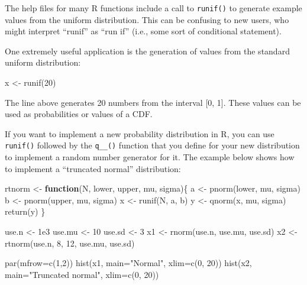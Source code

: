 \documentclass[
  13,
  letterpaper,
]{report}
\newenvironment{Shaded}{\begin{snugshade}}{\end{snugshade}}
\newcommand{\AttributeTok}[1]{\textcolor[rgb]{0.40,0.45,0.13}{#1}}
\newcommand{\ControlFlowTok}[1]{\textcolor[rgb]{0.00,0.23,0.31}{\textbf{#1}}}
\newcommand{\DecValTok}[1]{\textcolor[rgb]{0.68,0.00,0.00}{#1}}
\newcommand{\FloatTok}[1]{\textcolor[rgb]{0.68,0.00,0.00}{#1}}
\newcommand{\FunctionTok}[1]{\textcolor[rgb]{0.28,0.35,0.67}{#1}}
\newcommand{\NormalTok}[1]{\textcolor[rgb]{0.00,0.23,0.31}{#1}}
\newcommand{\OtherTok}[1]{\textcolor[rgb]{0.00,0.23,0.31}{#1}}
\newcommand{\StringTok}[1]{\textcolor[rgb]{0.13,0.47,0.30}{#1}}
\begin{document}
The help files for many R functions include a call to \texttt{runif()}
to generate example values from the uniform distribution. This can be
confusing to new users, who might interpret ``runif'' as ``run if''
(i.e., some sort of conditional statement).

One extremely useful application is the generation of values from the
standard uniform distribution:

\begin{Shaded}
\begin{Highlighting}[]
\NormalTok{x }\OtherTok{\textless{}{-}} \FunctionTok{runif}\NormalTok{(}\DecValTok{20}\NormalTok{)}
\end{Highlighting}
\end{Shaded}

The line above generates 20 numbers from the interval {[}0, 1{]}. These
values can be used as probabilities or values of a CDF.

If you want to implement a new probability distribution in R, you can
use \texttt{runif()} followed by the \texttt{q\_\_()} function that you
define for your new distribution to implement a random number generator
for it. The example below shows how to implement a ``truncated normal''
distribution:

\begin{Shaded}
\begin{Highlighting}[]
\NormalTok{rtnorm }\OtherTok{\textless{}{-}} \ControlFlowTok{function}\NormalTok{(N, lower, upper, mu, sigma)\{}
\NormalTok{    a }\OtherTok{\textless{}{-}} \FunctionTok{pnorm}\NormalTok{(lower, mu, sigma)}
\NormalTok{    b }\OtherTok{\textless{}{-}} \FunctionTok{pnorm}\NormalTok{(upper, mu, sigma)}
\NormalTok{    x }\OtherTok{\textless{}{-}} \FunctionTok{runif}\NormalTok{(N, a, b)}
\NormalTok{    y }\OtherTok{\textless{}{-}} \FunctionTok{qnorm}\NormalTok{(x, mu, sigma)}
    \FunctionTok{return}\NormalTok{(y)}
\NormalTok{\}}

\NormalTok{use.n }\OtherTok{\textless{}{-}} \FloatTok{1e3}
\NormalTok{use.mu }\OtherTok{\textless{}{-}} \DecValTok{10}
\NormalTok{use.sd }\OtherTok{\textless{}{-}} \DecValTok{3}
\NormalTok{x1 }\OtherTok{\textless{}{-}} \FunctionTok{rnorm}\NormalTok{(use.n, use.mu, use.sd)}
\NormalTok{x2 }\OtherTok{\textless{}{-}} \FunctionTok{rtnorm}\NormalTok{(use.n, }\DecValTok{8}\NormalTok{, }\DecValTok{12}\NormalTok{, use.mu, use.sd)}

\FunctionTok{par}\NormalTok{(}\AttributeTok{mfrow=}\FunctionTok{c}\NormalTok{(}\DecValTok{1}\NormalTok{,}\DecValTok{2}\NormalTok{))}
\FunctionTok{hist}\NormalTok{(x1, }\AttributeTok{main=}\StringTok{"Normal"}\NormalTok{, }\AttributeTok{xlim=}\FunctionTok{c}\NormalTok{(}\DecValTok{0}\NormalTok{, }\DecValTok{20}\NormalTok{))}
\FunctionTok{hist}\NormalTok{(x2, }\AttributeTok{main=}\StringTok{"Truncated normal"}\NormalTok{, }\AttributeTok{xlim=}\FunctionTok{c}\NormalTok{(}\DecValTok{0}\NormalTok{, }\DecValTok{20}\NormalTok{))}
\end{Highlighting}
\end{Shaded}
\end{document}

